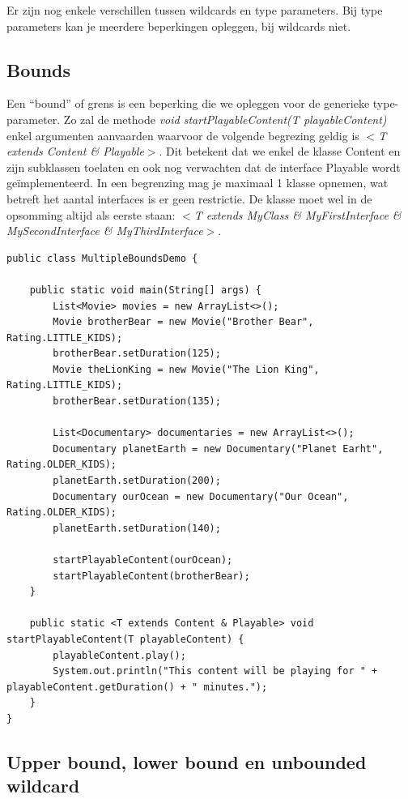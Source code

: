 Er zijn nog enkele verschillen tussen wildcards en type parameters.
Bij type parameters kan je meerdere beperkingen opleggen, bij wildcards niet.

\subsection{Bounds}

Een ``bound'' of grens is een beperking die we opleggen voor de generieke type-parameter. 
Zo zal de methode \textit{void startPlayableContent(T playableContent)} enkel argumenten aanvaarden waarvoor de volgende begrezing geldig is \textit{$<$T extends Content \& Playable$>$}. Dit betekent dat we enkel de klasse Content en zijn subklassen toelaten en ook nog verwachten dat de interface Playable wordt ge\"implementeerd. 
In een begrenzing mag je maximaal 1 klasse opnemen, wat betreft het aantal interfaces is er geen restrictie. De klasse moet wel in de opsomming altijd als eerste staan:
\textit{
$<$T extends MyClass \& MyFirstInterface \& MySecondInterface \& MyThirdInterface$>$}.

\begin{lstlisting}
public class MultipleBoundsDemo {

	public static void main(String[] args) {
		List<Movie> movies = new ArrayList<>();
		Movie brotherBear = new Movie("Brother Bear", Rating.LITTLE_KIDS);
		brotherBear.setDuration(125);
		Movie theLionKing = new Movie("The Lion King", Rating.LITTLE_KIDS);
		brotherBear.setDuration(135);

		List<Documentary> documentaries = new ArrayList<>();
		Documentary planetEarth = new Documentary("Planet Earht", Rating.OLDER_KIDS);
		planetEarth.setDuration(200);
		Documentary ourOcean = new Documentary("Our Ocean", Rating.OLDER_KIDS);
		planetEarth.setDuration(140);

		startPlayableContent(ourOcean);
		startPlayableContent(brotherBear);
	}

	public static <T extends Content & Playable> void startPlayableContent(T playableContent) {
		playableContent.play();
		System.out.println("This content will be playing for " + playableContent.getDuration() + " minutes.");
	}
}
\end{lstlisting}

\subsection{Upper bound, lower bound en unbounded wildcard}

